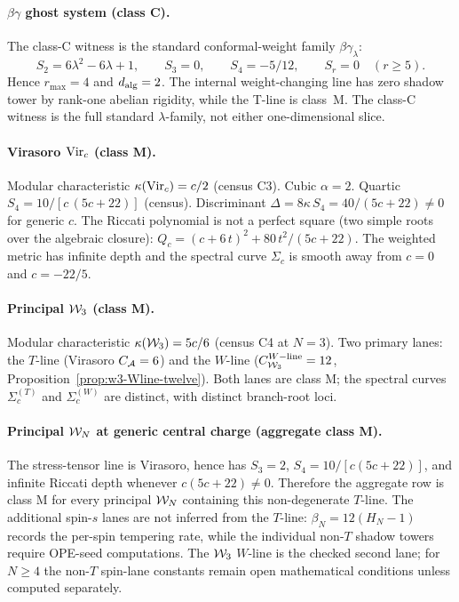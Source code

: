 \paragraph{$\beta\gamma$ ghost system (class C).}
The class-C witness is the standard conformal-weight family
$\beta\gamma_\lambda$:
\[
S_2 = 6\lambda^2 - 6\lambda + 1,\qquad
S_3 = 0,\qquad
S_4 = -5/12,\qquad
S_r = 0 \quad (r \ge 5).
\]
Hence $r_{\max} = 4$ and $d_{\rm alg} = 2$. The internal
weight-changing line has zero shadow tower by rank-one abelian
rigidity, while the T-line is class~M. The class-C witness is the
full standard $\lambda$-family, not either one-dimensional slice.

\paragraph{Virasoro $\mathrm{Vir}_c$ (class M).}
Modular characteristic $\kappa(\mathrm{Vir}_c) = c/2$ (census C3). Cubic
$\alpha = 2$. Quartic $S_4 = 10/[c\,(5 c + 22)]$ (census). Discriminant
$\Delta = 8 \kappa\,S_4 = 40/(5 c + 22) \neq 0$ for generic $c$. The
Riccati polynomial is not a perfect square (two simple roots over the
algebraic closure):
$Q_c = (c + 6\,t)^{2} + 80\,t^{2}/(5 c + 22)$. The weighted metric
has infinite depth and the spectral curve $\Sigma_c$ is smooth away
from $c=0$ and $c=-22/5$.

\paragraph{Principal $\mathcal{W}_3$ (class M).}
Modular characteristic $\kappa(\mathcal{W}_3) = 5 c/6$ (census C4 at
$N = 3$). Two primary lanes: the $T$-line (Virasoro $C_{\mathcal{A}} = 6$) and
the $W$-line ($C^{W{\rm-line}}_{\mathcal{W}_3} = 12$,
Proposition~\ref{prop:w3-Wline-twelve}). Both lanes are class M;
the spectral curves $\Sigma_c^{(T)}$ and $\Sigma_c^{(W)}$ are
distinct, with distinct branch-root loci.

\paragraph{Principal $\mathcal{W}_N$ at generic central charge (aggregate class M).}
The stress-tensor line is Virasoro, hence has
$S_3=2$, $S_4=10/[c(5c+22)]$, and infinite Riccati depth whenever
$c(5c+22)\ne0$. Therefore the aggregate row is class M for every
principal $\mathcal{W}_N$ containing this non-degenerate $T$-line. The
additional spin-$s$ lanes are not inferred from the $T$-line:
$\beta_N=12(H_N-1)$ records the per-spin tempering rate, while the
individual non-$T$ shadow towers require OPE-seed computations. The
$\mathcal{W}_3$ $W$-line is the checked second lane; for $N\ge4$ the
non-$T$ spin-lane constants remain open mathematical conditions unless computed
separately.

